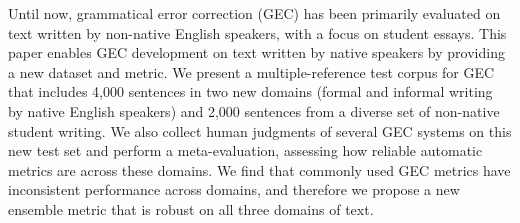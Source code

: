 Until now, grammatical error correction (GEC) has been primarily evaluated on text written by non-native English speakers, with a focus on student essays. This paper enables GEC development on text written by native speakers by providing a new dataset and metric. We present a multiple-reference test corpus for GEC that includes 4,000 sentences in two new domains (formal and informal writing by native English speakers) and 2,000 sentences from a diverse set of non-native student writing. We also collect human judgments of several GEC systems on this new test set and perform a meta-evaluation, assessing how reliable automatic metrics are across these domains. We find that commonly used GEC metrics have inconsistent performance across domains, and therefore we propose a new ensemble metric that is robust on all three domains of text.